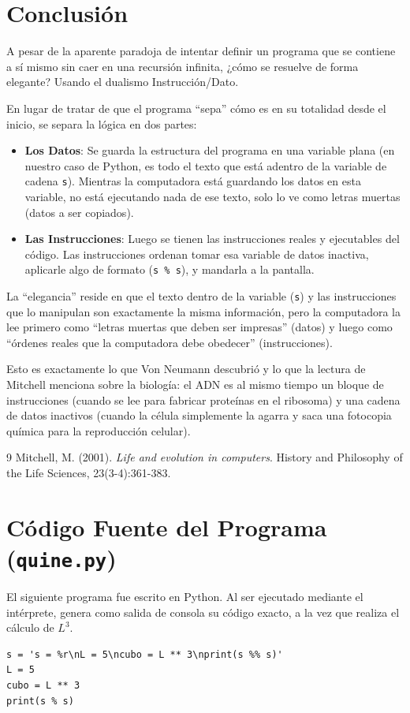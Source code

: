 \documentclass[a4paper,12pt]{article}
\begin{document}
\section{Conclusión}
A pesar de la aparente paradoja de intentar definir un programa que se contiene a sí mismo sin caer en una recursión infinita, ¿cómo se resuelve de forma elegante? Usando el dualismo Instrucción/Dato.

En lugar de tratar de que el programa ``sepa'' cómo es en su totalidad desde el inicio, se separa la lógica en dos partes:
\begin{itemize}
    \item \textbf{Los Datos}: Se guarda la estructura del programa en una variable plana (en nuestro caso de Python, es todo el texto que está adentro de la variable de cadena \texttt{s}). Mientras la computadora está guardando los datos en esta variable, no está ejecutando nada de ese texto, solo lo ve como letras muertas (datos a ser copiados).
    \item \textbf{Las Instrucciones}: Luego se tienen las instrucciones reales y ejecutables del código. Las instrucciones ordenan tomar esa variable de datos inactiva, aplicarle algo de formato (\texttt{s \% s}), y mandarla a la pantalla.
\end{itemize}

La ``elegancia'' reside en que el texto dentro de la variable (\texttt{s}) y las instrucciones que lo manipulan son exactamente la misma información, pero la computadora la lee primero como ``letras muertas que deben ser impresas'' (datos) y luego como ``órdenes reales que la computadora debe obedecer'' (instrucciones).

Esto es exactamente lo que Von Neumann descubrió y lo que la lectura de Mitchell menciona sobre la biología: el ADN es al mismo tiempo un bloque de instrucciones (cuando se lee para fabricar proteínas en el ribosoma) y una cadena de datos inactivos (cuando la célula simplemente la agarra y saca una fotocopia química para la reproducción celular).

\begin{thebibliography}{9}
Mitchell, M. (2001). \textit{Life and evolution in computers}. History and Philosophy of the Life Sciences, 23(3-4):361-383.
\end{thebibliography}

\appendix
\section{Código Fuente del Programa (\texttt{quine.py})}
El siguiente programa fue escrito en Python. Al ser ejecutado mediante el intérprete, genera como salida de consola su código exacto, a la vez que realiza el cálculo de $L^3$.

\begin{lstlisting}
s = 's = %r\nL = 5\ncubo = L ** 3\nprint(s %% s)'
L = 5
cubo = L ** 3
print(s % s)
\end{lstlisting}
\end{document}
